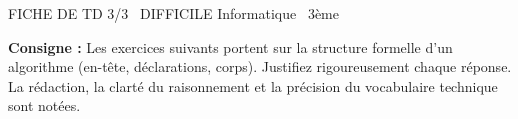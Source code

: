 \documentclass[11pt]{article}
\begin{document}
\begin{tcolorbox}[enhanced,colback=popink,colframe=popink,arc=10pt,boxrule=0pt,left=12pt,right=12pt,top=9pt,bottom=9pt]
{\color{white}\popxbold\small FICHE DE TD 3/3 \textbullet\ DIFFICILE \hfill Informatique \textbullet\ 3ème\par}
\end{tcolorbox}
\vspace{4pt}
\noindent\textbf{Consigne :} Les exercices suivants portent sur la structure formelle d'un algorithme (en-tête, déclarations, corps). Justifiez rigoureusement chaque réponse. La rédaction, la clarté du raisonnement et la précision du vocabulaire technique sont notées.
\end{document}
